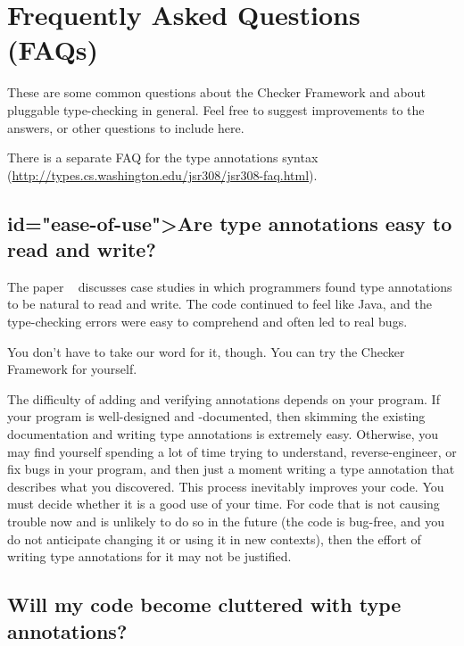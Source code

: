 \section{Frequently Asked Questions (FAQs)\label{faq}}

These are some common questions about the Checker Framework and about
pluggable type-checking in general.  Feel free to suggest improvements to
the answers, or other questions to include here.

There is a separate FAQ for the type annotations syntax
(\url{http://types.cs.washington.edu/jsr308/jsr308-faq.html}).


\subsection{ id="ease-of-use">Are type annotations easy to read and write?}

The paper
~\cite{PapiACPE2008} discusses case studies in
which programmers
found type annotations to be natural to read and write.  The code
continued to feel like Java, and the type-checking errors were easy to
comprehend and often led to real bugs.

You don't have to take our word for it, though.  You can try the
Checker Framework for yourself.

The difficulty of adding and verifying annotations depends on your program.
If your program is well-designed and -documented, then skimming the
existing documentation and writing type annotations is extremely easy.
Otherwise, you may find yourself spending a lot of time trying to
understand, reverse-engineer, or fix bugs in your program, and then just a
moment writing a type annotation that describes what you discovered.  This
process inevitably improves your code.  You must decide whether it is a
good use of your time.  For code that is not causing trouble now and is
unlikely to do so in the future (the code is bug-free, and you do not
anticipate changing it or using it in new contexts), then the
effort of writing type annotations for it may not be justified.


\subsection{Will my code become cluttered with type annotations?}

